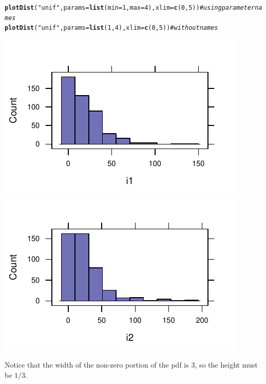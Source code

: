 \documentclass[twoside]{book}\usepackage[]{graphicx}\usepackage[]{xcolor}
\makeatletter
\def\maxwidth{ %
  \ifdim\Gin@nat@width>\linewidth
    \linewidth
  \else
    \Gin@nat@width
  \fi
}
\newcommand{\hlnum}[1]{\textcolor[rgb]{0.686,0.059,0.569}{#1}}%
\newcommand{\hlstr}[1]{\textcolor[rgb]{0.192,0.494,0.8}{#1}}%
\newcommand{\hlcom}[1]{\textcolor[rgb]{0.678,0.584,0.686}{\textit{#1}}}%
\newcommand{\hlstd}[1]{\textcolor[rgb]{0.345,0.345,0.345}{#1}}%
\newcommand{\hlkwc}[1]{\textcolor[rgb]{0.333,0.667,0.333}{#1}}%
\newcommand{\hlkwd}[1]{\textcolor[rgb]{0.737,0.353,0.396}{\textbf{#1}}}%
\newenvironment{kframe}{%
 \def\at@end@of@kframe{}%
 \ifinner\ifhmode%
  \def\at@end@of@kframe{\end{minipage}}%
  \begin{minipage}{\columnwidth}%
 \fi\fi%
 \def\FrameCommand##1{\hskip\@totalleftmargin \hskip-\fboxsep
 \colorbox{shadecolor}{##1}\hskip-\fboxsep
     \hskip-\linewidth \hskip-\@totalleftmargin \hskip\columnwidth}%
 \MakeFramed {\advance\hsize-\width
   \@totalleftmargin\z@ \linewidth\hsize
   \@setminipage}}%
 {\par\unskip\endMakeFramed%
 \at@end@of@kframe}
\newenvironment{knitrout}{}{} %
\makeatother
\begin{document}
\begin{knitrout}
\color{fgcolor}\begin{kframe}
\begin{alltt}
\hlkwd{plotDist}\hlstd{(}\hlstr{"unif"}\hlstd{,} \hlkwc{params} \hlstd{=} \hlkwd{list}\hlstd{(}\hlkwc{min} \hlstd{=} \hlnum{1}\hlstd{,} \hlkwc{max} \hlstd{=} \hlnum{4}\hlstd{),} \hlkwc{xlim} \hlstd{=} \hlkwd{c}\hlstd{(}\hlnum{0}\hlstd{,} \hlnum{5}\hlstd{))}  \hlcom{# using parameter names}
\hlkwd{plotDist}\hlstd{(}\hlstr{"unif"}\hlstd{,} \hlkwc{params} \hlstd{=} \hlkwd{list}\hlstd{(}\hlnum{1}\hlstd{,} \hlnum{4}\hlstd{),} \hlkwc{xlim} \hlstd{=} \hlkwd{c}\hlstd{(}\hlnum{0}\hlstd{,} \hlnum{5}\hlstd{))}  \hlcom{# without names}
\end{alltt}
\end{kframe}

{\centering \includegraphics[width=\maxwidth]{figures/fig-unnamed-chunk-33-1} 
\includegraphics[width=\maxwidth]{figures/fig-unnamed-chunk-33-2} 

}



\end{knitrout}
Notice that the width of the non-zero portion of the pdf is 3, so the height must be $1/3$.
\end{document}

